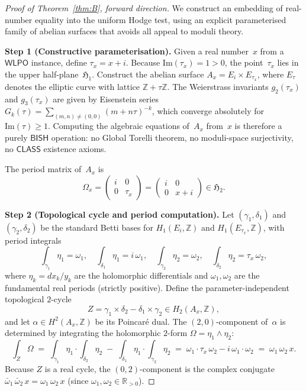 \documentclass[11pt]{article}
\theoremstyle{plain}
\theoremstyle{definition}
\theoremstyle{remark}
\newcommand{\Z}{\mathbb{Z}}
\newcommand{\R}{\mathbb{R}}
\newcommand{\BISH}{\ensuremath{\mathsf{BISH}}}
\newcommand{\WLPO}{\ensuremath{\mathsf{WLPO}}}
\newcommand{\CLASS}{\ensuremath{\mathsf{CLASS}}}
\begin{document}
\begin{proof}[Proof of Theorem~\ref{thm:B}, forward direction]
We construct an embedding of real-number equality into the uniform
Hodge test, using an explicit parameterised family of abelian
surfaces that avoids all appeal to moduli theory.

\textbf{Step 1 (Constructive parameterisation).}
Given a real number~$x$ from a $\WLPO$ instance, define
$\tau_x = x + i$.  Because $\mathrm{Im}(\tau_x) = 1 > 0$,
the point~$\tau_x$ lies in the upper half-plane~$\mathfrak{H}_1$.
Construct the abelian surface
$A_x = E_i \times E_{\tau_x}$,
where $E_\tau$ denotes the elliptic curve with lattice
$\Z + \tau\Z$.  The Weierstrass invariants $g_2(\tau_x)$
and $g_3(\tau_x)$ are given by Eisenstein series
$G_k(\tau) = \sum_{(m,n) \neq (0,0)} (m + n\tau)^{-k}$,
which converge absolutely for $\mathrm{Im}(\tau) \geq 1$.
Computing the algebraic equations of~$A_x$ from~$x$ is therefore
a purely $\BISH$ operation: no Global Torelli theorem,
no moduli-space surjectivity, no $\CLASS$ existence axioms.

The period matrix of~$A_x$ is
\[
  \Omega_x = \begin{pmatrix} i & 0 \\ 0 & \tau_x \end{pmatrix}
  = \begin{pmatrix} i & 0 \\ 0 & x + i \end{pmatrix}
  \in \mathfrak{H}_2.
\]

\textbf{Step 2 (Topological cycle and period computation).}
Let $(\gamma_1, \delta_1)$ and $(\gamma_2, \delta_2)$ be the
standard Betti bases for $H_1(E_i, \Z)$ and
$H_1(E_{\tau_x}, \Z)$, with period integrals
\[
  \int_{\gamma_1}\!\eta_1 = \omega_1,\quad
  \int_{\delta_1}\!\eta_1 = i\,\omega_1,\quad
  \int_{\gamma_2}\!\eta_2 = \omega_2,\quad
  \int_{\delta_2}\!\eta_2 = \tau_x\,\omega_2,
\]
where $\eta_k = dx_k/y_k$ are the holomorphic differentials and
$\omega_1, \omega_2$ are the fundamental real periods (strictly
positive).  Define the parameter-independent topological $2$-cycle
\[
  Z = \gamma_1 \times \delta_2 - \delta_1 \times \gamma_2
  \in H_2(A_x, \Z),
\]
and let $\alpha \in H^2(A_x, \Z)$ be its Poincar\'e dual.  The
$(2,0)$-component of~$\alpha$ is determined by integrating the
holomorphic $2$-form $\Omega = \eta_1 \wedge \eta_2$:
\[
  \int_Z \Omega \;=\;
  \int_{\gamma_1}\!\eta_1 \cdot \int_{\delta_2}\!\eta_2
  \;-\; \int_{\delta_1}\!\eta_1 \cdot \int_{\gamma_2}\!\eta_2
  \;=\; \omega_1 \cdot \tau_x\,\omega_2 - i\,\omega_1 \cdot \omega_2
  \;=\; \omega_1\,\omega_2\,x.
\]
Because $Z$ is a real cycle, the $(0,2)$-component is the complex
conjugate $\bar\omega_1\,\bar\omega_2\,x = \omega_1\,\omega_2\,x$
(since $\omega_1, \omega_2 \in \R_{>0}$).


\end{proof}
\end{document}
